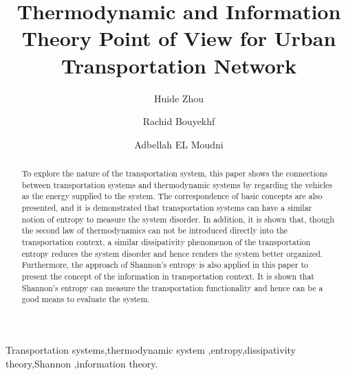 \documentclass[preprint,authoryear,12pt]{elsarticle}
\begin{document}
\begin{frontmatter}

\title{Thermodynamic and Information Theory Point of View for Urban
Transportation Network}
\author[SeT]{Huide Zhou}
\author[SeT]{Rachid Bouyekhf}
\author[SeT]{Adbellah EL Moudni}
\address[SeT]{Laboratoire Syst\`{e}mes et Transports (SeT),\\
Universit\'{e} de Technologie de Belfort-Montb\'{e}liard (UTBM)\\
Rue Thierry Mieg, 90010 Belfort Cedex, France}

\begin{abstract}
To explore the nature of the transportation system, this paper shows the connections between transportation systems and thermodynamic systems by regarding the vehicles as the energy supplied to the system. The correspondence of basic concepts are also presented, and it is demonstrated that transportation systems can have a similar notion of entropy to measure the system disorder. In addition, it is shown that, though the second law of thermodynamics can not be introduced directly into the transportation context, a similar dissipativity phenomenon of the transportation entropy  reduces the system disorder and hence renders the system  better organized.
Furthermore, the approach of Shannon's entropy is also applied in this paper to present the concept of the information in transportation context. It is shown that Shannon's entropy can measure the transportation functionality  and hence can be a good means to evaluate the system. 
\end{abstract}

\begin{keyword}
Transportation systems\sep thermodynamic system \sep entropy\sep dissipativity theory\sep Shannon \sep information theory.
\end{keyword}

\end{frontmatter}
\end{document}
